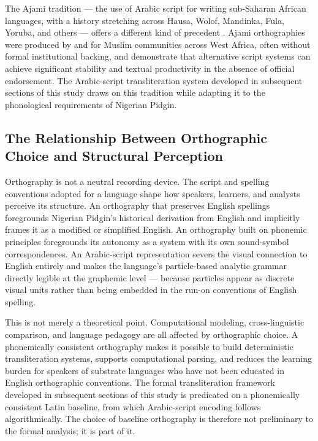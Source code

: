 \documentclass[12pt]{article}
\begin{document}
The Ajami tradition --- the use of Arabic script for writing sub-Saharan African languages, with a history stretching across Hausa, Wolof, Mandinka, Fula, Yoruba, and others --- offers a different kind of precedent \cite{Ngom2010}. Ajami orthographies were produced by and for Muslim communities across West Africa, often without formal institutional backing, and demonstrate that alternative script systems can achieve significant stability and textual productivity in the absence of official endorsement. The Arabic-script transliteration system developed in subsequent sections of this study draws on this tradition while adapting it to the phonological requirements of Nigerian Pidgin.

\subsection{The Relationship Between Orthographic Choice and Structural Perception}

Orthography is not a neutral recording device. The script and spelling conventions adopted for a language shape how speakers, learners, and analysts perceive its structure. An orthography that preserves English spellings foregrounds Nigerian Pidgin's historical derivation from English and implicitly frames it as a modified or simplified English. An orthography built on phonemic principles foregrounds its autonomy as a system with its own sound-symbol correspondences. An Arabic-script representation severs the visual connection to English entirely and makes the language's particle-based analytic grammar directly legible at the graphemic level --- because particles appear as discrete visual units rather than being embedded in the run-on conventions of English spelling.

This is not merely a theoretical point. Computational modeling, cross-linguistic comparison, and language pedagogy are all affected by orthographic choice. A phonemically consistent orthography makes it possible to build deterministic transliteration systems, supports computational parsing, and reduces the learning burden for speakers of substrate languages who have not been educated in English orthographic conventions. The formal transliteration framework developed in subsequent sections of this study is predicated on a phonemically consistent Latin baseline, from which Arabic-script encoding follows algorithmically. The choice of baseline orthography is therefore not preliminary to the formal analysis; it is part of it.
\end{document}
